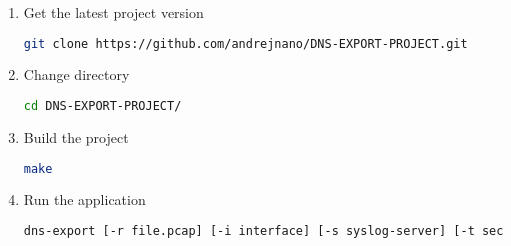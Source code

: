 \begin{enumerate}
\item Get the latest project version
\begin{lstlisting}[language=Bash] 
 git clone https://github.com/andrejnano/DNS-EXPORT-PROJECT.git 
\end{lstlisting}
\item Change directory
\begin{lstlisting}[language=Bash] 
cd DNS-EXPORT-PROJECT/
\end{lstlisting}
\item Build the project
\begin{lstlisting}[language=Bash] 
make
\end{lstlisting}
\item Run the application
\begin{lstlisting}[language=Bash] 
dns-export [-r file.pcap] [-i interface] [-s syslog-server] [-t seconds]
\end{lstlisting}
\end{enumerate}